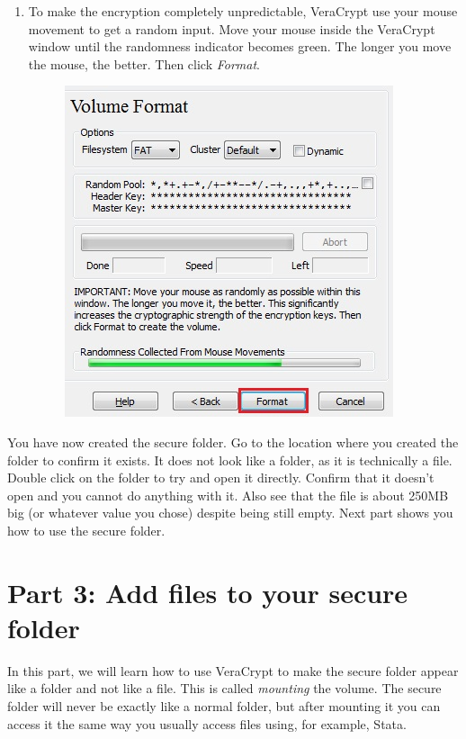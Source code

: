 \documentclass{tufte-handout}
\begin{document}
\begin{enumerate}
	
	\item To make the encryption completely unpredictable, VeraCrypt use your mouse movement to get a random input. Move your mouse inside the VeraCrypt window until the randomness indicator becomes green. The longer you move the mouse, the better. Then click \textit{Format}.
	\begin{figure}%
		\includegraphics[width=.7\linewidth]{img/vc_install_9.png}
	\end{figure}
	\FloatBarrier
\end{enumerate}

	\noindent You have now created the secure folder. Go to the location where you created the folder to confirm it exists. It does not look like a folder, as it is technically a file. Double click on the folder to try and open it directly. Confirm that it doesn't open and you cannot do anything with it. Also see that the file is about 250MB big (or whatever value you chose) despite being still empty. Next part shows you how to use the secure folder.

\section{Part 3: Add files to your secure folder}

	In this part, we will learn how to use VeraCrypt to make the secure folder appear like a folder and not like a file. This is called \textit{mounting} the volume. The secure folder will never be exactly like a normal folder, but after mounting it you can access it the same way you usually access files using, for example, Stata.
	
\end{document}

